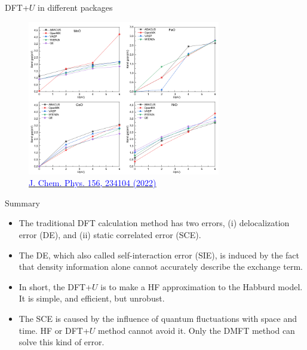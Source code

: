 \documentclass{beamer}
\begin{document}
  \begin{frame}{DFT+\(U\) in different packages}
    \begin{figure}
      \centering\includegraphics[width=0.75\textwidth]{figure/DFTU-diff-packages.png}\\
      \href{https://doi.org/10.1063/5.0090122}{\textcolor{blue}{\tiny{}J. Chem. Phys. 156, 234104 (2022)}}
    \end{figure}
  \end{frame}

  \begin{frame}{Summary}
    \begin{block}{}
      \begin{itemize}
        \item The traditional DFT calculation method has two errors, (i) delocalization error (DE), and (ii) static correlated error (SCE). 
        
        \item The DE, which also called self-interaction error (SIE), is induced by the fact that density information alone cannot accurately describe the exchange term.
        
        \item In short, the DFT+\(U\) is to make a HF approximation to the Habburd model. It is simple, and efficient, but unrobust.
        
        \item The SCE is caused by the influence of quantum fluctuations with space and time. HF or DFT+\(U\) method cannot avoid it. Only the DMFT method can solve this kind of error.
      \end{itemize}
    \end{block}
  \end{frame}
\end{document}
